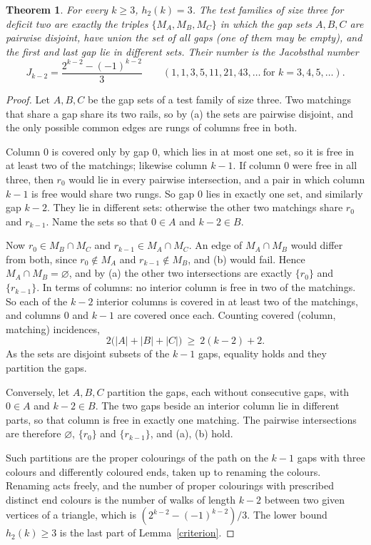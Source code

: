 \documentclass[11pt]{article}
\newtheorem{theorem}{Theorem}
\theoremstyle{remark}
\begin{document}
\begin{theorem}\label{three}
For every \(k\ge3\), \(h_2(k)=3\). The test families of size three for
deficit two are exactly the triples \(\{M_A,M_B,M_C\}\) in which the gap
sets \(A,B,C\) are pairwise disjoint, have union the set of all gaps (one of
them may be empty), and the first and last gap lie in different sets. Their number is the Jacobsthal number
\[
  J_{k-2}=\frac{2^{k-2}-(-1)^{k-2}}{3}\qquad(1,1,3,5,11,21,43,\dots\ \text{for }k=3,4,5,\dots).
\]
\end{theorem}
\begin{proof}
Let \(A,B,C\) be the gap sets of a test family of size three. Two matchings
that share a gap share its two rails, so by (a) the sets are pairwise
disjoint, and the only possible common edges are rungs of columns free in
both.

Column \(0\) is covered only by gap \(0\), which lies in at most one set, so
it is free in at least two of the matchings; likewise column \(k-1\). If
column \(0\) were free in all three, then \(r_0\) would lie in every
pairwise intersection, and a pair in which column \(k-1\) is free would
share two rungs. So gap \(0\) lies in exactly one set, and similarly gap
\(k-2\). They lie in different sets: otherwise the other two matchings share
\(r_0\) and \(r_{k-1}\). Name the sets so that \(0\in A\) and \(k-2\in B\).

Now \(r_0\in M_B\cap M_C\) and \(r_{k-1}\in M_A\cap M_C\). An edge of
\(M_A\cap M_B\) would differ from both, since \(r_0\notin M_A\) and
\(r_{k-1}\notin M_B\), and (b) would fail. Hence \(M_A\cap M_B=\varnothing\),
and by (a) the other two intersections are exactly \(\{r_0\}\) and
\(\{r_{k-1}\}\). In terms of columns: no interior column is free in two of
the matchings. So each of the \(k-2\) interior columns is covered in at
least two of the matchings, and columns \(0\) and \(k-1\) are covered once
each. Counting covered (column, matching) incidences,
\[
  2\bigl(|A|+|B|+|C|\bigr)\ \ge\ 2(k-2)+2 .
\]
As the sets are disjoint subsets of the \(k-1\) gaps, equality holds and
they partition the gaps.

Conversely, let \(A,B,C\) partition the gaps, each without consecutive gaps,
with \(0\in A\) and \(k-2\in B\). The two gaps beside an interior column lie
in different parts, so that column is free in exactly one matching. The
pairwise intersections are therefore \(\varnothing\), \(\{r_0\}\) and
\(\{r_{k-1}\}\), and (a), (b) hold.

Such partitions are the proper colourings of the path on the \(k-1\) gaps
with three colours and differently coloured ends, taken up to renaming the
colours. Renaming acts freely, and the number of proper colourings with
prescribed distinct end colours is the number of walks of length \(k-2\)
between two given vertices of a triangle, which is \((2^{k-2}-(-1)^{k-2})/3\).
The lower bound \(h_2(k)\ge3\) is the last part of Lemma~\ref{criterion}.
\end{proof}
\end{document}
